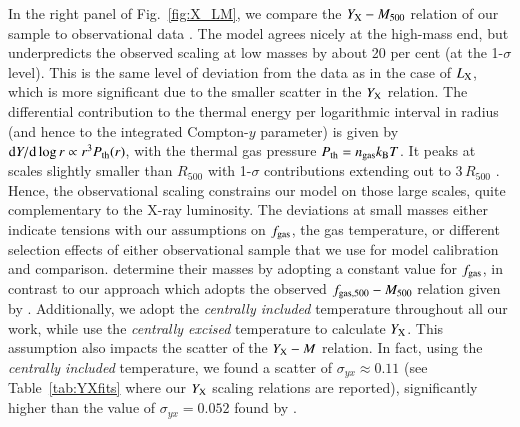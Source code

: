 \documentclass[useAMS,usenatbib]{mn2e}
\newcommand{\dd}{\mathrm{d}}
\begin{document}
In the right panel of Fig.~\ref{fig:X_LM}, we compare the $Y_{{\mathrm{X}}}-M_{500}$
relation of our sample to observational data \citep{2010MNRAS.406.1773M}. The
model agrees nicely at the high-mass end, but underpredicts the observed scaling
at low masses by about 20 per cent (at the 1-$\sigma$ level). This is the same level
of deviation from the data as in the case of $L_{{\mathrm{X}}}$, which is more
significant due to the smaller scatter in the $Y_{{\mathrm{X}}}$ relation. The
differential contribution to the thermal energy per logarithmic interval in
radius (and hence to the integrated Compton-$y$ parameter) is given by $\dd Y
/\dd\log r \propto r^3 P_{\rmn{th}}(r)$, with the thermal gas pressure
$P_{{\mathrm{th}}}=n_{{\mathrm{gas}}}k_{{\mathrm{B}}}T$. It peaks at scales slightly smaller
than $R_{500}$ with 1-$\sigma$ contributions extending out to $3\,R_{500}$
\citep{2010ApJ...725...91B}. Hence, the observational scaling constrains our
model on those large scales, quite complementary to the X-ray luminosity. The
deviations at small masses either indicate tensions with our assumptions on
$f_{{\mathrm{gas}}}$, the gas temperature, or different selection effects of either
observational sample that we use for model calibration and comparison.
\cite{2010MNRAS.406.1773M} determine their masses by adopting a constant value
for $f_{{\mathrm{gas}}}$, in contrast to our approach which adopts the observed
$f_{{\mathrm{gas}},500}-M_{500}$ relation given by
\cite{2009ApJ...693.1142S}. Additionally, we adopt the
\cite{2010MNRAS.406.1773M} \emph{centrally included} temperature throughout all
our work, while \cite{2010MNRAS.406.1773M} use the \emph{centrally excised}
temperature to calculate $Y_{{\mathrm{X}}}$. This assumption also impacts the scatter
of the $Y_{{\mathrm{X}}}-M$ relation. In fact, using the \emph{centrally included}
temperature, we found a scatter of $\sigma_{yx} \approx 0.11$ (see
Table~\ref{tab:YXfits} where our $Y_{{\mathrm{X}}}$ scaling relations are reported),
significantly higher than the value of $\sigma_{yx} = 0.052$ found by
\cite{2010MNRAS.406.1773M}.
\end{document}
